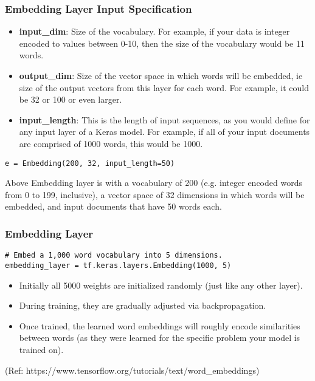 \begin{frame}[fragile]\frametitle{Embedding Layer Input Specification}

\begin{itemize}
\item {\bf input\_dim}: Size of the vocabulary. For example, if your data is integer encoded to values between 0-10, then the size of the vocabulary would be 11 words.
\item {\bf output\_dim}: Size of the vector space in which words will be embedded, ie size of the output vectors from this layer for each word. For example, it could be 32 or 100 or even larger.
\item {\bf input\_length}: This is the length of input sequences, as you would define for any input layer of a Keras model. For example, if all of your input documents are comprised of 1000 words, this would be 1000.
\end{itemize}

\begin{lstlisting}
e = Embedding(200, 32, input_length=50)
\end{lstlisting}

Above Embedding layer is with a vocabulary of 200 (e.g. integer encoded words from 0 to 199, inclusive), a vector space of 32 dimensions in which words will be embedded, and input documents that have 50 words each.
\end{frame}

\begin{frame}[fragile]\frametitle{Embedding Layer}

\begin{lstlisting}
# Embed a 1,000 word vocabulary into 5 dimensions.
embedding_layer = tf.keras.layers.Embedding(1000, 5)
\end{lstlisting}

\begin{itemize}
\item Initially all 5000 weights are initialized randomly (just like any other layer).
\item During training, they are gradually adjusted via backpropagation. 
\item Once trained, the learned word embeddings will roughly encode similarities between words (as they were learned for the specific problem your model is trained on).
\end{itemize}

{\tiny (Ref: https://www.tensorflow.org/tutorials/text/word\_embeddings)}

\end{frame}


